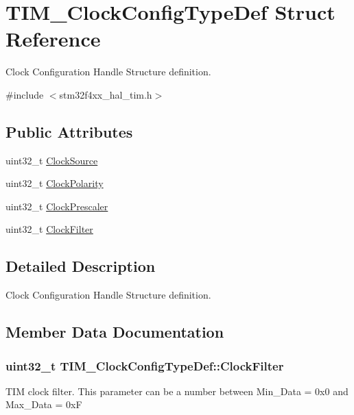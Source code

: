 \hypertarget{struct_t_i_m___clock_config_type_def}{}\section{T\+I\+M\+\_\+\+Clock\+Config\+Type\+Def Struct Reference}
\label{struct_t_i_m___clock_config_type_def}


Clock Configuration Handle Structure definition.  




{\ttfamily \#include $<$stm32f4xx\+\_\+hal\+\_\+tim.\+h$>$}

\subsection*{Public Attributes}
\begin{DoxyCompactItemize}
\item 
uint32\+\_\+t \hyperlink{struct_t_i_m___clock_config_type_def_a54c329013b5f6f87d1c3d2495fca84d2}{Clock\+Source}
\item 
uint32\+\_\+t \hyperlink{struct_t_i_m___clock_config_type_def_a66453fa8dc8a300267ff5aba08eff5c4}{Clock\+Polarity}
\item 
uint32\+\_\+t \hyperlink{struct_t_i_m___clock_config_type_def_ae4c0cb6f58da0ec7b99f1c6411d2fee1}{Clock\+Prescaler}
\item 
uint32\+\_\+t \hyperlink{struct_t_i_m___clock_config_type_def_adaf66568c766f75c4c661a872ca399e3}{Clock\+Filter}
\end{DoxyCompactItemize}


\subsection{Detailed Description}
Clock Configuration Handle Structure definition. 

\subsection{Member Data Documentation}
\subsubsection[{\texorpdfstring{Clock\+Filter}{ClockFilter}}]{\setlength{\rightskip}{0pt plus 5cm}uint32\+\_\+t T\+I\+M\+\_\+\+Clock\+Config\+Type\+Def\+::\+Clock\+Filter}\hypertarget{struct_t_i_m___clock_config_type_def_adaf66568c766f75c4c661a872ca399e3}{}\label{struct_t_i_m___clock_config_type_def_adaf66568c766f75c4c661a872ca399e3}
T\+IM clock filter. This parameter can be a number between Min\+\_\+\+Data = 0x0 and Max\+\_\+\+Data = 0xF 
